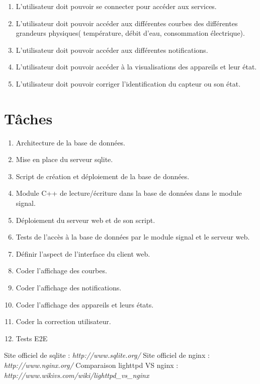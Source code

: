\documentclass[10pt,a4paper]{article}
\begin{document}
\begin{enumerate}[label=\bfseries US\arabic* :]
    \item L'utilisateur doit pouvoir se connecter pour accéder aux services.
    \item L'utilisateur doit pouvoir accéder aux différentes courbes des différentes grandeurs physiques( température, débit d'eau, consommation électrique).
    \item L'utilisateur doit pouvoir accéder aux différentes notifications.
    \item L'utilisateur doit pouvoir accéder à la visualisations des appareils et leur état.
    \item L'utilisateur doit pouvoir corriger l'identification du capteur ou son état.
\end{enumerate}

\section{Tâches}

\begin{enumerate}[label=\bfseries\Alph* :]
    \item Architecture de la base de données.
    \item Mise en place du serveur sqlite.
    \item Script de création et déploiement de la base de données.
    \item Module C++ de lecture/écriture dans la base de données dans le module signal.
    \item Déploiement du serveur web et de son script.
    \item Tests de l'accès à la base de données par le module signal et le serveur web.
    \item Définir l'aspect de l'interface du client web.
    \item Coder l'affichage des courbes.
    \item Coder l'affichage des notifications. 
    \item Coder l'affichage des appareils et leurs états.
    \item Coder la correction utilisateur.
    \item Tests E2E
\end{enumerate}


\begin{thebibliography}{10}
    Site officiel de sqlite : \emph{http://www.sqlite.org/}
    Site officiel de nginx : \emph{http://www.nginx.org/}
    Comparaison lighttpd VS nginx :  \emph{http://www.wikivs.com/wiki/lighttpd\_vs\_nginx}
\end{thebibliography}
\end{document}
